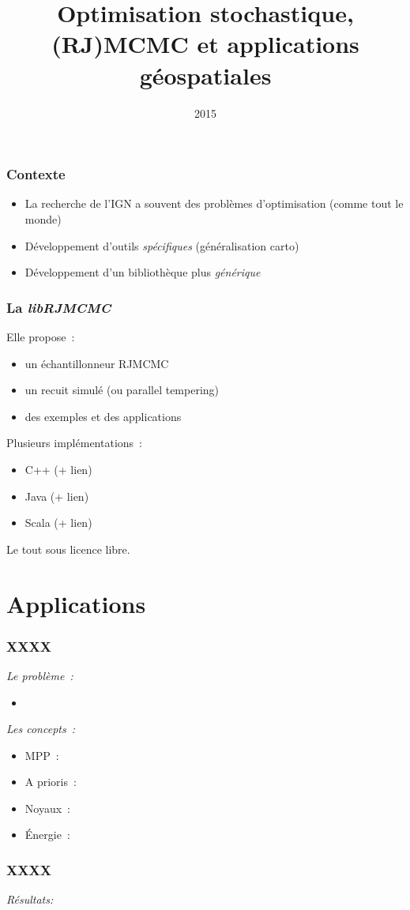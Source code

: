 \documentclass{beamer}
\title{Optimisation stochastique, (RJ)MCMC et applications g\'eospatiales}
\author{}
\institute{IGN}
\date{2015}
\begin{document}
\frame{\titlepage}
 
\begin{frame}
\frametitle{Contexte}
\begin{itemize}
\item La recherche de l'IGN a souvent des probl\`emes d'optimisation (comme tout le monde)
\item D\'eveloppement d'outils \emph{sp\'ecifiques} (g\'en\'eralisation carto)
\item D\'eveloppement d'un biblioth\`eque plus \emph{g\'en\'erique}
\end{itemize}
\end{frame}

\begin{frame}
\frametitle{La \emph{libRJMCMC}}
Elle propose~:
\begin{itemize}
\item un \'echantillonneur RJMCMC
\item un recuit simul\'e (ou parallel tempering)
\item des exemples et des applications
\end{itemize}
Plusieurs impl\'ementations~:
\begin{itemize}
\item C++ (+ lien)
\item Java (+ lien)
\item Scala (+ lien)
\end{itemize}
Le tout sous licence libre.
\end{frame}

\section{Applications}

\begin{frame}
\frametitle{XXXX}
\emph{Le probl\`eme~:} 
\begin{itemize}
\item
\end{itemize}
\emph{Les concepts~:}

\begin{itemize}
\item MPP~:
\item A prioris~:
\item Noyaux~:
\item \'Energie~:
\end{itemize}
\end{frame}

\begin{frame}
\frametitle{XXXX}
\emph{R\'esultats:}
\end{frame}
\end{document}
